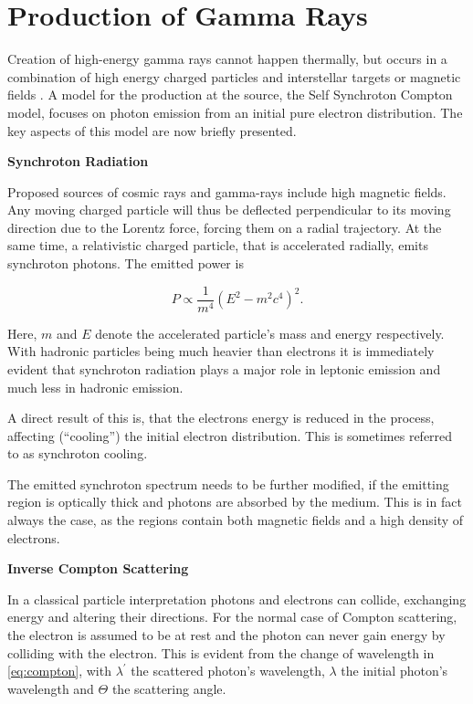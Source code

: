 \section{Production of Gamma Rays}
Creation of high-energy gamma rays cannot happen thermally,
but occurs in a combination of high energy charged particles 
and interstellar targets or magnetic fields \cite{funcray}.
A model for the production at the source, the Self Synchroton Compton model,
focuses on photon emission from an initial pure electron distribution.
The key aspects of this model are now briefly presented. 

\textbf{Synchroton Radiation}

Proposed sources of cosmic rays and gamma-rays include 
high magnetic fields. Any moving charged particle will thus be
deflected perpendicular to its moving direction
due to the Lorentz force, forcing them on a radial trajectory.
At the same time, a relativistic charged particle, 
that is accelerated radially, emits synchroton 
photons. The emitted power is

\begin{equation}
	P \propto \frac{1}{m^4} \left(E^2 - m^2c^4\right)^2.
	\label{eq:synchroton}
\end{equation}

Here, $m$ and $E$ denote the accelerated particle's 
mass and energy respectively. %
With hadronic particles being much heavier than electrons
it is immediately evident that
synchroton radiation plays a major role in leptonic 
emission and much less in hadronic emission.

A direct result of this is, that the electrons energy is reduced
in the process, affecting (\enquote{cooling}) the initial electron distribution.
This is sometimes referred to as synchroton cooling.

The emitted synchroton spectrum needs to be further modified,
if the emitting region is optically thick and photons 
are absorbed by the medium.
This is in fact always the case, as the regions contain
both magnetic fields and a high density of electrons.

\textbf{Inverse Compton Scattering}

In a classical particle interpretation photons and electrons 
can collide, exchanging energy and altering their directions.
For the normal case of Compton scattering, the electron 
is assumed to be at rest and the photon can never gain 
energy by colliding with the electron.
This is evident from the change of wavelength in \eqref{eq:compton},
with $\lambda^{\prime}$ the scattered photon's 
wavelength, $\lambda$ the initial photon's wavelength  
and $\Theta$ the scattering angle.

